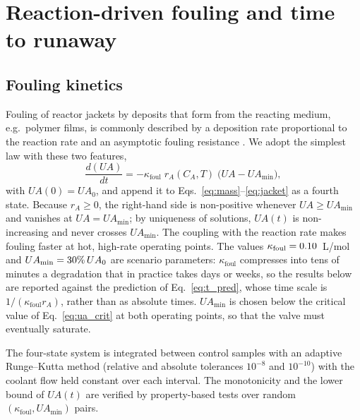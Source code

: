 \section{Reaction-driven fouling and time to runaway}
\label{sec:fouling}

\subsection{Fouling kinetics}
Fouling of reactor jackets by deposits that form from the reacting medium, e.g.\ polymer films, is commonly described by a deposition rate proportional to the reaction rate and an asymptotic fouling resistance \cite{bott1995fouling,epstein1983thinking,macchietto2011fouling}. We adopt the simplest law with these two features,
\begin{equation}
\frac{d(UA)}{dt} = -\kappa_{\mathrm{foul}}\; r_A(C_A,T)\;\bigl(UA-UA_{\min}\bigr),
\label{eq:fouling}
\end{equation}
with $UA(0)=UA_0$, and append it to Eqs.~\eqref{eq:mass}--\eqref{eq:jacket} as a fourth state. Because $r_A\ge0$, the right-hand side is non-positive whenever $UA\ge UA_{\min}$ and vanishes at $UA=UA_{\min}$; by uniqueness of solutions, $UA(t)$ is non-increasing and never crosses $UA_{\min}$. The coupling with the reaction rate makes fouling faster at hot, high-rate operating points. The values $\kappa_{\mathrm{foul}}=0.10$~L/mol and $UA_{\min}=30\%\,UA_0$ are scenario parameters: $\kappa_{\mathrm{foul}}$ compresses into tens of minutes a degradation that in practice takes days or weeks, so the results below are reported against the prediction of Eq.~\eqref{eq:t_pred}, whose time scale is $1/(\kappa_{\mathrm{foul}}r_A)$, rather than as absolute times. $UA_{\min}$ is chosen below the critical value of Eq.~\eqref{eq:ua_crit} at both operating points, so that the valve must eventually saturate.

The four-state system is integrated between control samples with an adaptive Runge--Kutta method (relative and absolute tolerances $10^{-8}$ and $10^{-10}$) with the coolant flow held constant over each interval. The monotonicity and the lower bound of $UA(t)$ are verified by property-based tests over random $(\kappa_{\mathrm{foul}},UA_{\min})$ pairs.

